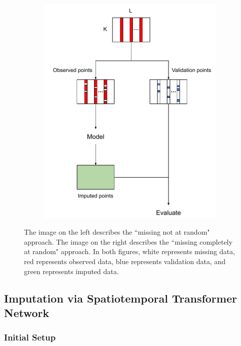 \documentclass[review]{elsarticle}
\begin{document}
\begin{figure}[H]
\begin{subfigure}[b]{0.45\textwidth}
         \includegraphics[width=\textwidth]{figure/missing_at_random.pdf}
		 \caption{}
	\label{fig: missing at random}
     \end{subfigure}
    
     \caption{The image on the left describes the ``missing not at random" approach. The image on the right describes the ``missing completely at random" approach. In both figures, white represents missing data, red represents observed data, blue represents validation data, and green represents imputed data.}
     \label{fig: missing pattern}
\end{figure}






\subsection{Imputation via Spatiotemporal Transformer Network}\label{sec: Imputation via Spatiotemporal Transformer Network}

\subsubsection*{Initial Setup}\label{sec: Model Training Setup}
\end{document}
